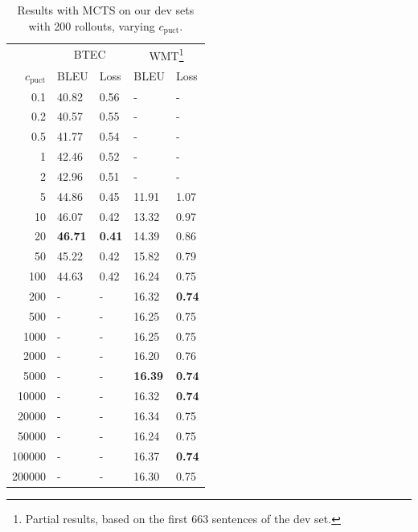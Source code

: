 \documentclass[11pt,a4paper]{article}
\begin{document}
\begin{table}
\centering
\begin{tabular}{r l l l l}
\toprule
& \multicolumn{2}{c}{BTEC} & \multicolumn{2}{c}{WMT\footnote{Partial results, based on the first 663 sentences of the dev set.}} \\
\cmidrule(l{2pt}r{2pt}){2-3} \cmidrule(l{2pt}r{2pt}){4-5}
$c_{\text{puct}}$ & BLEU & Loss & BLEU & Loss \\
\midrule
0.1 & 40.82 & 0.56 & - & - \\
0.2 & 40.57 & 0.55 & - & - \\
0.5 & 41.77 & 0.54 & - & - \\
1 & 42.46 & 0.52 & - & - \\
2 & 42.96 & 0.51 & - & - \\
5 & 44.86 & 0.45 & 11.91 & 1.07 \\
10 & 46.07 & 0.42 & 13.32 & 0.97 \\
20 & \textbf{46.71} & \textbf{0.41} & 14.39 & 0.86 \\
50 & 45.22 & 0.42 & 15.82 & 0.79 \\
100 & 44.63 & 0.42 & 16.24 & 0.75 \\
200 & - & - & 16.32 & \textbf{0.74} \\
500 & - & - & 16.25 & 0.75 \\
1000 & - & - & 16.25 & 0.75 \\
2000 & - & - & 16.20 & 0.76 \\
5000 & - & - & \textbf{16.39} & \textbf{0.74} \\
10000 & - & - & 16.32 & \textbf{0.74} \\
20000 & - & - & 16.34 & 0.75 \\
50000 & - & - & 16.24 & 0.75 \\
100000 & - & - & 16.37 & \textbf{0.74} \\
200000 & - & - & 16.30 & 0.75 \\
\bottomrule
\end{tabular}
\caption{Results with MCTS on our dev sets with 200 rollouts, varying $c_{\text{puct}}$.}
\label{tab:btec_mcts_cpuct}
\end{table}
\end{document}
